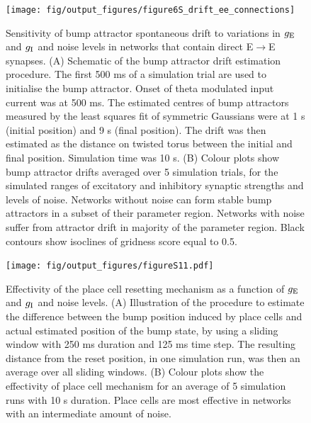 \documentclass[a4paper,12pt]{article}
\newcommand{\ssc}[3]{\ensuremath{#1_{\text{#2}_{\text{#3}}}}}
\newcommand{\gE      }{\ssc{g}      {\scriptsize{E}}{}}
\newcommand{\gI      }{\ssc{g}      {\scriptsize{I}}{}}
\begin{document}
\begin{figure}[ht!]
    \internallinenumbers
    \centering
        \texttt{[image: fig/output\_figures/figure6S\_drift\_ee\_connections]}
    \caption{Sensitivity of bump attractor spontaneous drift to variations in
    $\gE$ and $\gI$ and noise levels in networks that contain direct
    E$\rightarrow$E synapses. (A) Schematic of the bump attractor drift
    estimation procedure. The first 500 ms of a simulation trial are used to
    initialise the bump attractor. Onset of theta modulated input current was
    at 500 ms.  The estimated centres of bump attractors measured by the least
    squares fit of symmetric Gaussians were at 1 s (initial position) and 9 s
    (final position). The drift was then estimated as the distance on twisted
    torus between the initial and final position. Simulation time was 10 s. (B)
    Colour plots show bump attractor drifts averaged over 5 simulation trials,
    for the simulated ranges of excitatory and inhibitory synaptic strengths
    and levels of noise.  Networks without noise can form stable bump
    attractors in a subset of their parameter region. Networks with noise
    suffer from attractor drift in majority of the parameter region. Black
    contours show isoclines of gridness score equal to 0.5.}
\end{figure}

\clearpage

\begin{figure}[ht!]
    \internallinenumbers
    \centering
        \texttt{[image: fig/output\_figures/figureS11.pdf]}
    \caption{Effectivity of the place cell resetting mechanism as a function of
    $\gE$ and $\gI$ and noise levels. (A) Illustration of the procedure to
    estimate the difference between the bump position induced by place cells
    and actual estimated position of the bump state, by using a sliding window
    with 250 ms duration and 125 ms time step. The resulting distance from the
    reset position, in one simulation run, was then an average over all sliding
    windows. (B) Colour plots show the effectivity of place cell mechanism for
    an average of 5 simulation runs with 10 s duration. Place cells are most
    effective in networks with an intermediate amount of noise.}
    \label{fig:S_pc_effectivity}
\end{figure}

\clearpage
\end{document}
